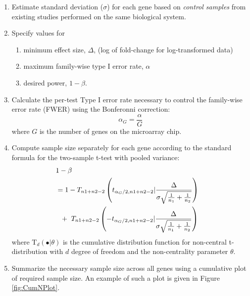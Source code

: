 \documentclass{bioinfo}
\begin{document}
\begin{enumerate}
\item{Estimate standard deviation ($\sigma$) for each gene based on
    \emph{control samples} from existing studies performed on the
    same biological system.}

\item{Specify values for
    \begin{enumerate}
    \item minimum effect size, $\Delta$, (log of fold-change for log-transformed data)
    \item maximum family-wise type I error rate, $\alpha$
    \item desired power, $1 - \beta$.
    \end{enumerate}
  }

\item{Calculate the per-test Type I error rate necessary to control
    the family-wise error rate (FWER) using the Bonferonni correction:}
\begin{equation}
  \alpha_G = \frac{\alpha}{G}
\end{equation}
%
where $G$ is the number of genes on the microarray chip.

\item{Compute sample size separately for each gene according to the
    standard formula for the two-sample t-test with pooled variance:}
  \begin{eqnarray}
    \lefteqn{1-\beta} \nonumber \\
    &= 1-T_{n1+n2-2} \left( t_{\alpha_G/2,n1+n2-2} | \frac{\Delta}{\sigma \sqrt{\frac{1}{n_1} + \frac{1}{n_2}}}\right) \nonumber \\
    &  ~~+~T_{n1+n2-2} \left( -t_{\alpha_G/2,n1+n2-2} | \frac{\Delta}{\sigma \sqrt{\frac{1}{n_1} + \frac{1}{n_2}}}\right)
    \label{eq:formula}
  \end{eqnarray}
  where $\mathrm{T}_{d}(\bullet|\theta)$ is the cumulative
  distribution function for non-central t-distribution with $d$ degree
  of freedom and the non-centrality parameter $\theta$.

\item{Summarize the necessary sample size across all genes using a
      cumulative plot of required sample size. An example of such a
      plot is given in Figure \ref{fig:CumNPlot}.}  

\end{enumerate}
\end{document}
